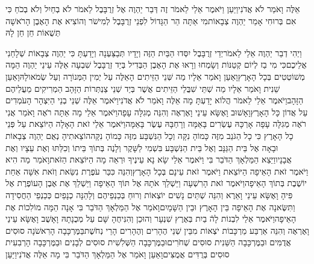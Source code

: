 \documentclass[../main/main.tex]{subfiles}
\begin{document}
\begin{multicols}{\ncols}
אֵלֶּה וָאֹמַר לֹא אֲדֹנִי\PreVerseSpace{}וַיַּעַן וַיֹּאמֶר אֵלַי לֵאמֹר זֶה דְּבַר יַהְוֶה אֶל זְרֻבָּבֶל לֵאמֹר לֹא בְחַיִל וְלֹא בְכֹחַ כִּי אִם בְּרוּחִי אָמַר יַהְוֶה צְבָאוֹת\PreVerseSpace{}מִי אַתָּה הַר הַגָּדוֹל לִפְנֵי זְרֻבָּבֶל לְמִישֹׁר וְהוֹצִיא אֶת הָאֶבֶן הָרֹאשָׁה תְּשֻׁאוֹת חֵן חֵן לָהּ\OpenSection{}\par
{}וַיְהִי דְבַר יַהְוֶה אֵלַי לֵאמֹר\PreVerseSpace{}יְדֵי זְרֻבָּבֶל יִסְּדוּ הַבַּיִת הַזֶּה וְיָדָיו תְּבַצַּעְנָה וְיָדַעְתָּ כִּי יַהְוֶה צְבָאוֹת שְׁלָחַנִי אֲלֵיכֶם\PreVerseSpace{}כִּי מִי בַז לְיוֹם קְטַנּוֹת וְשָׂמְחוּ וְרָאוּ אֶת הָאֶבֶן הַבְּדִיל בְּיַד זְרֻבָּבֶל שִׁבְעָה אֵלֶּה עֵינֵי יַהְוֶה הֵמָּה מְשׁוֹטְטִים בְּכָל הָאָרֶץ\PreVerseSpace{}וָאַעַן וָאֹמַר אֵלָיו מַה שְּׁנֵי הַזֵּיתִים הָאֵלֶּה עַל יְמִין הַמְּנוֹרָה וְעַל שְׂמֹאולָהּ\PreVerseSpace{}וָאַעַן שֵׁנִית וָאֹמַר אֵלָיו מַה שְׁתֵּי שִׁבֲּלֵי הַזֵּיתִים אֲשֶׁר בְּיַד שְׁנֵי צַנְתְּרוֹת הַזָּהָב הַמְרִיקִים מֵעֲלֵיהֶם הַזָּהָב\PreVerseSpace{}וַיֹּאמֶר אֵלַי לֵאמֹר הֲלוֹא יָדַעְתָּ מָה אֵלֶּה וָאֹמַר לֹא אֲדֹנִי\PreVerseSpace{}וַיֹּאמֶר אֵלֶּה שְׁנֵי בְנֵי הַיִּצְהָר הָעֹמְדִים עַל אֲדוֹן כָּל הָאָרֶץ\PreChapterSpace{}וָאָשׁוּב וָאֶשָּׂא עֵינַי וָאֶרְאֶה וְהִנֵּה מְגִלָּה עָפָה\PreVerseSpace{}וַיֹּאמֶר אֵלַי מָה אַתָּה רֹאֶה וָאֹמַר אֲנִי רֹאֶה מְגִלָּה עָפָה אָרְכָּהּ עֶשְׂרִים בָּאַמָּה וְרָחְבָּהּ עֶשֶׂר בָּאַמָּה\PreVerseSpace{}וַיֹּאמֶר אֵלַי זֹאת הָאָלָה הַיּוֹצֵאת עַל פְּנֵי כָל הָאָרֶץ כִּי כָל הַגֹּנֵב מִזֶּה כָּמוֹהָ נִקָּה וְכָל הַנִּשְׁבָּע מִזֶּה כָּמוֹהָ נִקָּה\PreVerseSpace{}הוֹצֵאתִיהָ נְאֻם יַהְוֶה צְבָאוֹת וּבָאָה אֶל בֵּית הַגַּנָּב וְאֶל בֵּית הַנִּשְׁבָּע בִּשְׁמִי לַשָּׁקֶר וְלָנֶה בְּתוֹךְ בֵּיתוֹ וְכִלַּתּוּ וְאֶת עֵצָיו וְאֶת אֲבָנָיו\PreVerseSpace{}וַיֵּצֵא הַמַּלְאָךְ הַדֹּבֵר בִּי וַיֹּאמֶר אֵלַי שָׂא נָא עֵינֶיךָ וּרְאֵה מָה הַיּוֹצֵאת הַזֹּאת\PreVerseSpace{}וָאֹמַר מַה הִיא וַיֹּאמֶר זֹאת הָאֵיפָה הַיּוֹצֵאת וַיֹּאמֶר זֹאת עֵינָם בְּכָל הָאָרֶץ\PreVerseSpace{}וְהִנֵּה כִּכַּר עֹפֶרֶת נִשֵּׂאת וְזֹאת אִשָּׁה אַחַת יוֹשֶׁבֶת בְּתוֹךְ הָאֵיפָה\PreVerseSpace{}וַיֹּאמֶר זֹאת הָרִשְׁעָה וַיַּשְׁלֵךְ אֹתָהּ אֶל תּוֹךְ הָאֵיפָה וַיַּשְׁלֵךְ אֶת אֶבֶן הָעוֹפֶרֶת אֶל פִּיהָ \ClosedSection{}וָאֶשָּׂא עֵינַי וָאֵרֶא וְהִנֵּה שְׁתַּיִם נָשִׁים יוֹצְאוֹת וְרוּחַ בְּכַנְפֵיהֶם וְלָהֵנָּה כְנָפַיִם כְּכַנְפֵי הַחֲסִידָה וַתִּשֶּׂאנָה אֶת הָאֵיפָה בֵּין הָאָרֶץ וּבֵין הַשָּׁמָיִם\PreVerseSpace{}וָאֹמַר אֶל הַמַּלְאָךְ הַדֹּבֵר בִּי אָנָה הֵמָּה מוֹלִכוֹת אֶת הָאֵיפָה\PreVerseSpace{}וַיֹּאמֶר אֵלַי לִבְנוֹת לָהֿ בַיִת בְּאֶרֶץ שִׁנְעָר וְהוּכַן וְהִנִּיחֻהָ שָּׁם עַל מְכֻנָתָהּ \ClosedSection{}וָאָשֻׁב וָאֶשָּׂא עֵינַי וָאֶרְאֶה וְהִנֵּה אַרְבַּע מַרְכָּבוֹת יֹצְאוֹת מִבֵּין שְׁנֵי הֶהָרִים וְהֶהָרִים הָרֵי נְחֹשֶׁת\PreVerseSpace{}בַּמֶּרְכָּבָה הָרִאשֹׁנָה סוּסִים אֲדֻמִּים וּבַמֶּרְכָּבָה הַשֵּׁנִית סוּסִים שְׁחֹרִים\PreVerseSpace{}וּבַמֶּרְכָּבָה הַשְּׁלִשִׁית סוּסִים לְבָנִים וּבַמֶּרְכָּבָה הָרְבִעִית סוּסִים בְּרֻדִּים אֲמֻצִּים\PreVerseSpace{}וָאַעַן וָאֹמַר אֶל הַמַּלְאָךְ הַדֹּבֵר בִּי מָה אֵלֶּה אֲדֹנִי\PreVerseSpace{}וַיַּעַן 
\end{multicols}
\end{document}
